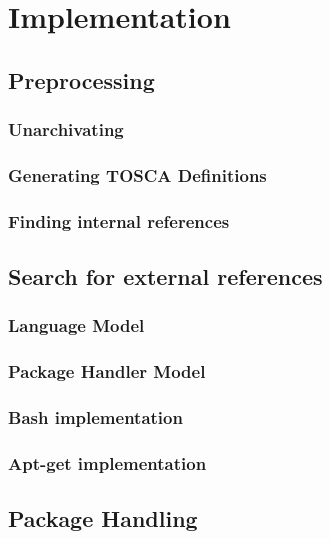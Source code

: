 
\chapter{Implementation}\label{chap:imp}


\fi
\section{Preprocessing}

\fi
\subsection*{Unarchivating}

\fi
\subsection*{Generating TOSCA Definitions}

\fi
\subsection*{Finding internal references}

\fi
\section{Search for external references}

\fi
\subsection*{Language Model}

\fi
\subsection*{Package Handler Model}

\fi
\subsection*{Bash implementation}

\fi
\subsection*{Apt-get implementation}


\fi
\section{Package Handling}

